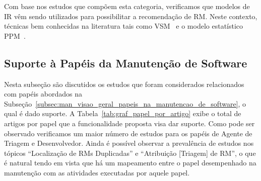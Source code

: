 Com base nos estudos que compõem esta categoria, verificamos que modelos de IR
vêm sendo utilizados para possibilitar a recomendação de RM\@. Neste contexto,
técnicas bem conhecidas na literatura tais como VSM~\cite{Wang2011bug} e o
modelo estatístico PPM~\cite{malheiros2012source}.

\subsection{Suporte à Papéis da Manutenção de Software}
\label{sub:extensões_com_suporte_a_papeis}

Nesta subseção são discutidos os estudos que foram considerados relacionados com
papéis abordados na
Subseção~\ref{subsec:man_visao_geral_papeis_na_manutencao_de_software}, o qual é
dado suporte. A Tabela~\ref{tab:graf_papel_por_artigo} exibe o total de artigos
por papel que a funcionalidade proposta visa dar suporte.  Como pode ser
observado verificamos um maior número de estudos para os papéis de Agente de
Triagem e Desenvolvedor. Ainda é possível observar a prevalência de estudos nos
tópicos ``Localização de RMs Duplicadas'' e ``Atribuição [Triagem] de RM'', o
que é natural tendo em vista que há um mapeamento entre o papel desempenhado na
manutenção com as atividades executadas por aquele papel.

\begin{table}[htpb]
\centering
{}
\caption{Total de artigos por papel na manutenção de software}
\label{tab:graf_papel_por_artigo}
\end{table}

